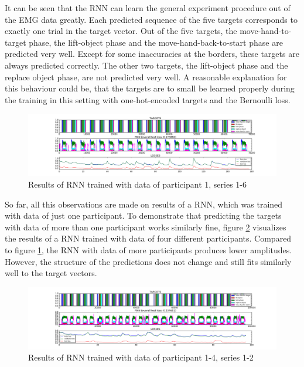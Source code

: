 \documentclass{article} %
\begin{document}
It can be seen that the RNN can learn the general experiment procedure out of the EMG data greatly.
Each predicted sequence of the five targets corresponds to exactly one trial in the target vector.
Out of the five targets, the move-hand-to-target phase, the lift-object phase and the move-hand-back-to-start phase are predicted very well.
Except for some inaccuracies at the borders, these targets are always predicted correctly.
The other two targets, the lift-object phase and the replace object phase, are not predicted very well.
A reasonable explanation for this behaviour could be, that the targets are to small be learned properly during the training in this setting with one-hot-encoded targets and the Bernoulli loss.
\begin{figure}
	\centering
	\includegraphics[trim=5.2cm 0.5cm 5cm 0.5cm, clip=true, width=1.0\textwidth]{images/EMG-results_participant_1_series1-6.png}
	\caption{Results of RNN trained with data of participant 1, series 1-6}
	\label{fig:emg_RNN_1}
\end{figure}

So far, all this observations are made on results of a RNN, which was trained with data of just one participant.
To demonstrate that predicting the targets with data of more than one participant works similarly fine, figure \ref{fig:emg_RNN_2} visualizes the results of a RNN trained with data of four different participants.
Compared to figure \ref{fig:emg_RNN_1}, the RNN with data of more participants produces lower amplitudes.
However, the structure of the predictions does not change and still fits similarly well to the target vectors.
\begin{figure}
	\centering
	\includegraphics[trim=5.2cm 0.5cm 5cm 0.5cm, clip=true, width=1.0\textwidth]{images/EMG-results_participant_1-4_series1-2.png}
	\caption{Results of RNN trained with data of participant 1-4, series 1-2}
	\label{fig:emg_RNN_2}
\end{figure}
\end{document}
